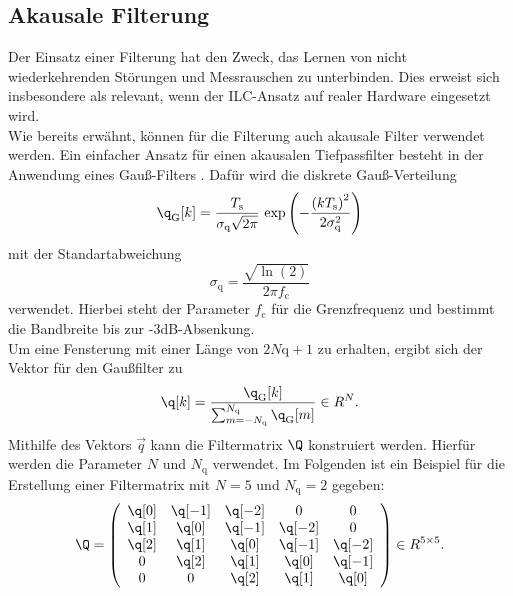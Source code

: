 \subsection{Akausale Filterung}
Der Einsatz einer Filterung hat den Zweck, das Lernen von nicht wiederkehrenden Störungen und Messrauschen zu unterbinden. Dies erweist sich insbesondere als relevant, wenn der ILC-Ansatz auf realer Hardware eingesetzt wird.\\
Wie bereits erwähnt, können für die Filterung auch akausale Filter verwendet werden.  Ein einfacher Ansatz für einen akausalen Tiefpassfilter besteht in der Anwendung eines Gauß-Filters \cite{UniWien}. Dafür wird die diskrete Gauß-Verteilung 
\begin{equation}
	\label{eq:disc_gaus_ver}
	\q_\mathrm{G}[k] = \frac{T_\mathrm{s}}{\sigma_\mathrm{q}\sqrt{2\pi}} \, \exp\left(-\frac{\left(kT_\mathrm{s}\right)^2}{2\sigma_\mathrm{q}^2}\right)
\end{equation}
mit der Standartabweichung 
\begin{equation}
	\label{eq:standabweichung}
	\sigma_\mathrm{q} = \frac{\sqrt{\ln(2)}}{2\pi f_\mathrm{c}}
\end{equation}
verwendet. Hierbei steht der Parameter $f_\mathrm{c}$ für die Grenzfrequenz und bestimmt die Bandbreite bis zur -3dB-Absenkung. \\
Um eine Fensterung mit einer Länge von $2N\mathrm{q}+1$ zu erhalten, ergibt sich der Vektor für den Gaußfilter zu
\begin{equation}
	\label{eq:disc_gaus}
	\q[k] = \frac{\q_\mathrm{G}[k]}{\sum_{m = -N_\mathrm{q}}^{N_\mathrm{q}}\q_\mathrm{G}[m]} \in R^N.
\end{equation}
Mithilfe des Vektors $\vec{q}$ kann die Filtermatrix $\Q$ konstruiert werden. Hierfür werden die Parameter $N$ und $N_\mathrm{q}$ verwendet. Im Folgenden ist ein Beispiel für die Erstellung einer Filtermatrix mit $N=5$ und $N_\mathrm{q}=2$ gegeben:
\begin{equation}
	\label{eq:filtermatrix}
	\Q = \left( \begin{array}{cccccc}
		\q[0] & \q[-1] & \q[-2] & 0 	 & 0\\
		\q[1] & \q[0]  & \q[-1] & \q[-2] & 0\\
		\q[2] & \q[1]  & \q[0]  & \q[-1] & \q[-2] \\
		0	 & \q[2]  & \q[1]  & \q[0]  & \q[-1] \\
		0 	 & 0 	 & \q[2]  & \q[1]  & \q[0] \\
	\end{array}\right) \in R^{5 \times 5}.
\end{equation}
